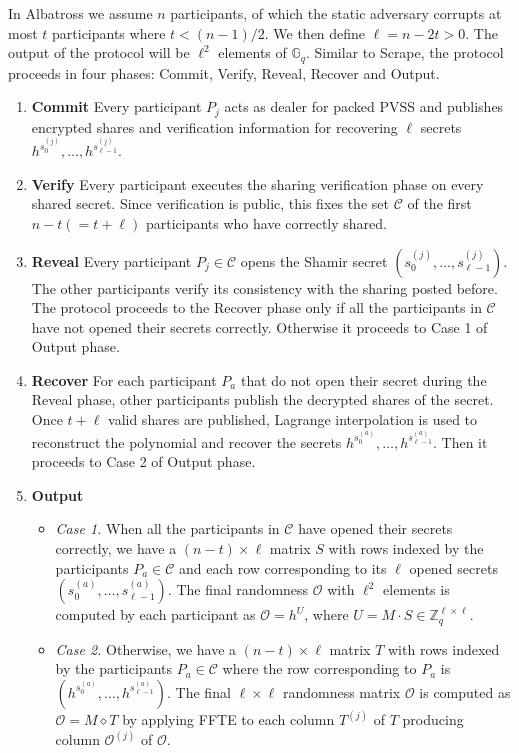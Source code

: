 \documentclass[letterpaper,twocolumn,10pt]{article}
\theoremstyle{definition}
\theoremstyle{remark}
\begin{document}
In Albatross we assume $n$ participants, of which the static adversary corrupts at most $t$ participants where $t<(n-1)/2$. We then define $\ell = n-2t >0 $. The output of the protocol will be $\ell^2$ elements of $\mathbb{G}_q$. Similar to Scrape, the protocol proceeds in four phases: Commit, Verify, Reveal, Recover and Output.
\begin{enumerate}
    \item \textbf{Commit} Every participant $P_j$ acts as dealer for packed PVSS and publishes encrypted shares and verification information for recovering $\ell$ secrets $h^{s^{(j)}_{0}}, \ldots, h^{s^{(j)}_{\ell-1}}$.
    \item \textbf{Verify} Every participant executes the sharing verification phase on every shared secret. Since verification is public, this fixes the set $\mathcal{C}$ of the first $n-t (= t + \ell)$ participants who have correctly shared.
    \item \textbf{Reveal} Every participant $P_j \in \mathcal{C}$ opens the Shamir secret $(s^{(j)}_{0}, \ldots, s^{(j)}_{\ell-1})$. The other participants verify its consistency with the sharing posted before. The protocol proceeds to the Recover phase only if all the participants in $\mathcal{C}$ have not opened their secrets correctly. Otherwise it proceeds to Case 1 of Output phase.
    \item \textbf{Recover} For each participant $P_a$ that do not open their secret during the Reveal phase, other participants publish the decrypted shares of the secret. Once $t+\ell$ valid shares are published, Lagrange interpolation is used to reconstruct the polynomial and recover the secrets $h^{s^{(a)}_{0}}, \ldots, h^{s^{(a)}_{\ell-1}}$. Then it proceeds to Case 2 of Output phase.
    \item \textbf{Output}
        \begin{itemize}
            \item \textit{Case 1.} When all the participants in $\mathcal{C}$ have opened their secrets correctly, we have a $(n-t) \times \ell$ matrix $S$ with rows indexed by the participants  $P_a \in \mathcal{C}$ and each row corresponding to its $\ell$ opened secrets $(s^{(a)}_{0}, \ldots, s^{(a)}_{\ell-1})$. The final randomness $\mathcal{O}$ with $\ell^2$ elements is computed by each participant as $\mathcal{O} = h^U$, where $U = M \cdot S \in \mathbb{Z}_q^{\ell \times \ell}$.
            
            \item \textit{Case 2.} Otherwise, we have a $(n-t) \times \ell$ matrix $T$ with rows indexed by the participants  $P_a \in \mathcal{C}$ where the row corresponding to $P_a$ is $(h^{s^{(a)}_{0}}, \ldots, h^{s^{(a)}_{\ell-1}})$. The final $\ell \times \ell$ randomness matrix $\mathcal{O}$ is computed as $\mathcal{O} = M \diamond T$ by applying FFTE to each column $T^{(j)}$ of $T$ producing column $\mathcal{O}^{(j)}$ of $\mathcal{O}$.
        \end{itemize}
\end{enumerate}
\end{document}
